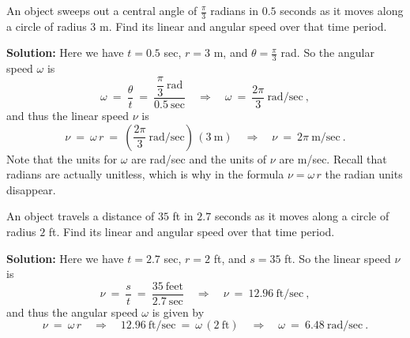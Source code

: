 \begin{center}\end{center}
\newpage
\begin{exmp}\label{exmp:linang}
 An object sweeps out a central angle of $\frac{\pi}{3}$ radians in $0.5$ seconds as it moves along
 a circle of radius $3$ m. Find its linear and angular speed over that time period.\vspace{1mm}
 \par\noindent\textbf{Solution:} Here we have $t=0.5$ sec, $r=3$ m, and $\theta = \frac{\pi}{3}$ rad.
 So the angular speed $\omega$ is
 \begin{displaymath}
  \omega ~=~ \frac{\theta}{t} ~=~ \frac{\dfrac{\pi}{3}~\text{rad}}{0.5~\text{sec}}
   \quad\Rightarrow\quad \boxed{\omega ~=~ \frac{2\pi}{3}~\text{rad/sec}} ~,
 \end{displaymath}
 and thus the linear speed $\nu$ is
 \begin{displaymath}
  \nu ~=~ \omega\,r ~=~ \left( \frac{2\pi}{3}~\text{rad/sec} \right) \,(3~\text{m})
   \quad\Rightarrow\quad \boxed{\nu ~=~ 2\pi~\text{m/sec}} ~.
 \end{displaymath}
 Note that the units for $\omega$ are rad/sec and the units of $\nu$ are m/sec. Recall that radians
 are actually unitless, which is why in the formula $\nu=\omega\,r$ the radian units disappear.
\end{exmp}
\begin{exmp}
 An object travels a distance of $35$ ft in $2.7$ seconds as it moves along
 a circle of radius $2$ ft. Find its linear and angular speed over that time period.\vspace{1mm}
 \par\noindent\textbf{Solution:} Here we have $t=2.7$ sec, $r=2$ ft, and $s=35$ ft. So the linear
 speed $\nu$ is
 \begin{displaymath}
  \nu ~=~ \frac{s}{t} ~=~ \frac{35~\text{feet}}{2.7~\text{sec}} \quad\Rightarrow\quad
   \boxed{\nu ~=~ 12.96~\text{ft/sec}} ~,
 \end{displaymath}
 and thus the angular speed $\omega$ is given by
 \begin{displaymath}
  \nu ~=~ \omega\,r \quad\Rightarrow\quad 12.96~\text{ft/sec} ~=~ \omega\,(2~\text{ft})
   \quad\Rightarrow\quad \boxed{\omega ~=~ 6.48~\text{rad/sec}} ~.
 \end{displaymath} 
\end{exmp}
